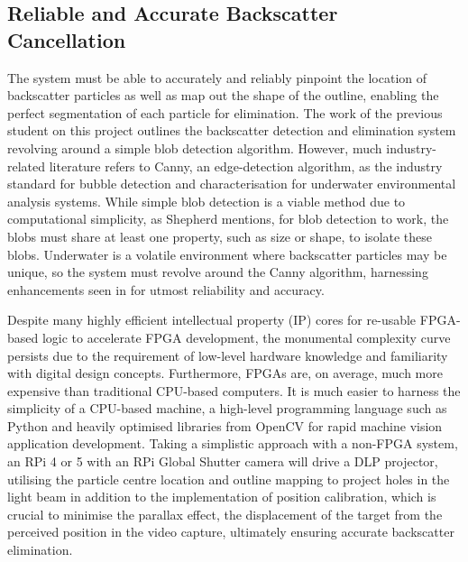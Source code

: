 \subsection{Reliable and Accurate Backscatter Cancellation}
The system must be able to accurately and reliably pinpoint the location of backscatter particles as well as map out the shape of the outline, enabling the perfect segmentation of each particle for elimination. The work of the previous student on this project \cite{katieshepherdMachineVisionBased2023} outlines the backscatter detection and elimination system revolving around a simple blob detection algorithm. However, much industry-related literature refers to Canny, an edge-detection algorithm, as the industry standard for bubble detection and characterisation for underwater environmental analysis systems. While simple blob detection is a viable method due to computational simplicity, as Shepherd mentions, for blob detection to work, the blobs must share at least one property, such as size or shape, to isolate these blobs. Underwater is a volatile environment where backscatter particles may be unique, so the system must revolve around the Canny algorithm, harnessing enhancements seen in \cite{zelenkaGasBubbleShape2014} for utmost reliability and accuracy.

Despite many highly efficient intellectual property (IP) cores for re-usable FPGA-based logic to accelerate FPGA development, the monumental complexity curve persists due to the requirement of low-level hardware knowledge and familiarity with digital design concepts. Furthermore, FPGAs are, on average, much more expensive than traditional CPU-based computers. It is much easier to harness the simplicity of a CPU-based machine, a high-level programming language such as Python and heavily optimised libraries from OpenCV for rapid machine vision application development. Taking a simplistic approach with a non-FPGA system, an RPi 4 or 5 with an RPi Global Shutter camera will drive a DLP projector, utilising the particle centre location and outline mapping to project holes in the light beam in addition to the implementation of position calibration, which is crucial to minimise the parallax effect, the displacement of the target from the perceived position in the video capture, ultimately ensuring accurate backscatter elimination.

